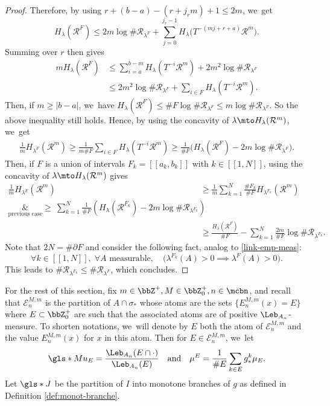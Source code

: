 \begin{proof}
Therefore, by using $r + (b-a) - (r+ j_r m) + 1 \leq 2m$, we~get
\[
H_{\lambda}(\mathcal{R}^F) \leq 2m \log \# \mathcal{R}_{\lambda^F} + \sum_{j=0}^{j_r - 1} H_{\lambda} \bigl (T^{-(mj + r+a)} \mathcal{R}^m \bigr).
\]
Summing over $r$ then gives
\begin{align*}
m H_{\lambda}(\mathcal{R}^F) &\leq \sum_{i=a}^{b-m} H_{\lambda}(T^{-i} \mathcal{R}^m) + 2m^2 \log \# \mathcal{R}_{\lambda^F}\\
&\leq 2m^2 \log \# \mathcal{R}_{\lambda^F} + \sum_{i \in F} H_{\lambda}(T^{-i} \mathcal{R}^m).
\end{align*}
Then, if $m \geq |b-a|$, we~have $H_{\lambda}(\mathcal{R}^F) \leq \# F \log \# \mathcal{R}_{\lambda^F} \leq m \log \# \mathcal{R}_{\lambda^F}$. So the above inequality still holds.
Hence, by using the concavity of $\lambda \mto H_{\lambda}(\mathcal{R}^m)$, we~get
\begin{align*}
\frac{1}{m} H_{\lambda^F}(\mathcal{R}^m) \geq \frac{1}{m \# F} \sum_{i \in F} H_{\lambda}(T^{-i} \mathcal{R}^m)
\geq \frac{1}{\# F} \bigl (H_{\lambda}(\mathcal{R}^F) - 2m \log \# \mathcal{R}_{\lambda^F} \bigr).
\end{align*}
Then, if $F$ is a union of intervals $F_k = [\![ a_k, b_k ]\!]$ with $k \in [\![ 1, N ]\!]$, using the concavity of $\lambda \mto H_{\lambda}(\mathcal{R}^m)$ gives
\begin{align*}
\frac{1}{m} H_{\lambda^F}(\mathcal{R}^m) &\geq \frac{1}{m} \sum_{k=1}^N \frac{\# F_k}{\# F} H_{\lambda^{F_k}}(\mathcal{R}^m)\\
\underset{\text{previous case}}&{\geq} \: \sum_{k=1}^N \frac{1}{\# F} \left (H_{\lambda}(\mathcal{R}^{F_k}) - 2m \log \# \mathcal{R}_{\lambda^{F_k}} \right)\\
&\geq \frac{H_{\lambda}(\mathcal{R}^F)}{\# F} - \sum_{k=1}^N \frac{2m}{\# F} \log \# \mathcal{R}_{\lambda^{F_k}}.
\end{align*}
Note that $2N = \# \partial F$ and consider the following fact, analog to \eqref{link-emp-meas}:
\[
\forall k \in [\![ 1, N ]\!],\; \forall A \text{ measurable},\quad \bigl (\lambda^{F_k}(A) > 0 \implies \lambda^F(A) > 0 \bigr).
\]
This leads to $\# \mathcal{R}_{\lambda^{F_k}} \leq \# \mathcal{R}_{\lambda^F}$, which concludes.
\end{proof}

For the rest of this section, fix $m \in \bbZ^+, M \in \bbZ_0^+, n \in \mcbn$, and recall that
$\mathcal{E}_n^{M,m}$ is the partition of $A \cap \sigma_*$ whose atoms are the sets $\{ E_n^{M,m}(x) = E \}$ where $E \subset \bbZ_0^+$ are such that the associated atoms are of positive $\Leb_{A_n}$-measure.
To shorten notations, we~will denote by $E$ both the atom of $\mathcal{E}_n^{M,m}$ and the value $E_n^{M,m}(x)$ for $x$ in this atom. Then for $E \in \mathcal{E}_n^{M,m}$, we~let
\[
\gls*{Mu_E} = \frac{\Leb_{A_n}(E \cap \cdot)}{\Leb_{A_n}(E)} \quad \text{and} \quad \mu^E = \frac{1}{\# E} \sum_{k \in E} g^k_* \mu_E.
\]
Let $\gls*{J}$ be the partition of $I$ into monotone branches of $g$ as defined in Definition \ref{def:monot-branche}.


